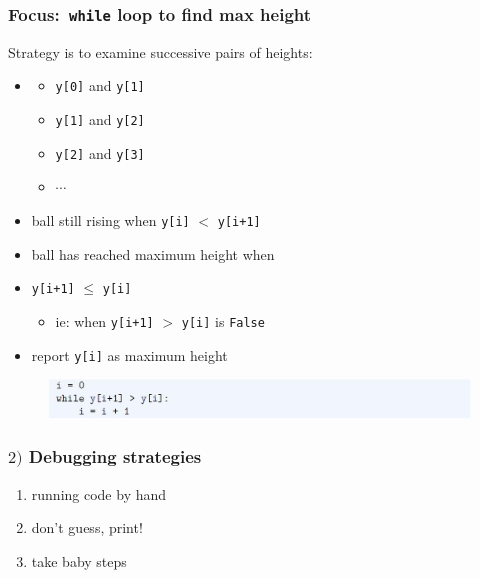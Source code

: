 \documentclass[english,14pt]{beamer}
\begin{document}
\begin{frame}[fragile]

\frametitle{Focus:~\texttt{while} loop to find max height}

Strategy is to examine successive pairs of heights:
\begin{itemize}
	\item[]
	\begin{itemize}
		\item \texttt{y[0]} and \texttt{y[1]} 
		\item \texttt{y[1]} and \texttt{y[2]} 
		\item \texttt{y[2]} and \texttt{y[3]}
		\item $\cdots$
	\end{itemize}
	
	\item ball still rising when \texttt{y[i]} $<$ \texttt{y[i+1]}
	\item ball has reached maximum height when \\
	\item[] \texttt{y[i+1]} $\leq$ \texttt{y[i]}
	\begin{itemize}
		\item[] ie: when \texttt{y[i+1]} $>$ \texttt{y[i]} is \texttt{False}
	\end{itemize}
	\item report \texttt{y[i]} as maximum height
\end{itemize}

\begin{figure}[ht]
	\centering
	\includegraphics[width=\textwidth]{figures/LLp71d}
\end{figure}

\end{frame}


\begin{frame}[fragile]

\frametitle{$2)$ Debugging strategies}

\begin{enumerate}
	\item running code by hand
	\item don't guess, print!
	\item take baby steps
\end{enumerate}

\end{frame}
\end{document}
